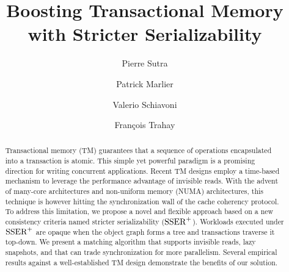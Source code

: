 \documentclass{svproc}
\begin{document}
{ \newcommand{\mynote}[3]{
   \fbox{\bfseries\sffamily\scriptsize#1}
   {\small$\blacktriangleright$\textsf{\emph{\color{#3}{#2}}}$\blacktriangleleft$}}}
{ \newcommand{\mynote}[3]{}}
\newcommand{\pf}[1]{\mynote{Pierre}{#1}{red}}
\newcommand{\hm}[1]{\mynote{Patrick}{#1}{pink}}
\newcommand{\vs}[1]{\mynote{Valerio}{#1}{blue}}
\newcommand{\ft}[1]{\mynote{Francois}{#1}{green}}


\title{Boosting Transactional Memory\\with Stricter Serializability}

\author{Pierre Sutra \and Patrick Marlier \and
 Valerio Schiavoni \and Fran\c{c}ois Trahay}

\maketitle

\begin{abstract}
  Transactional memory (TM) guarantees that a sequence of operations encapsulated into a transaction is atomic.
  This simple yet powerful paradigm is a promising direction for writing concurrent applications.
  Recent TM designs employ a time-based mechanism to leverage the performance advantage of invisible reads.
  With the advent of many-core architectures and non-uniform memory (NUMA) architectures, this technique is however hitting the synchronization wall of the cache coherency protocol.
  To address this limitation, we propose a novel and flexible approach based on a new consistency criteria named stricter serializability ($\SPSER$).
  Workloads executed under $\SPSER$ are opaque when the object graph forms a tree and transactions traverse it top-down.  
  We present a matching algorithm that supports invisible reads, lazy snapshots, and that can trade synchronization for more parallelism.
  Several empirical results against a well-established TM design demonstrate the benefits of our solution.
\end{abstract}




%




{
  \footnotesize
  
  
}  
\end{document}
